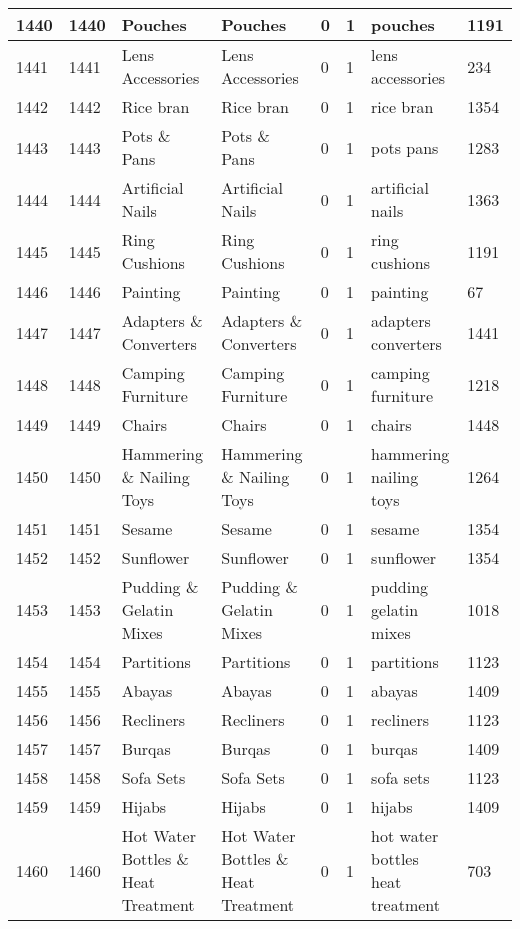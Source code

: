 \begin{longtable}{|l|l|l|l|l|l|l|l|}
1440 & 1440 & Pouches & Pouches & 0 & 1 & pouches & 1191 \\ \hline 
1441 & 1441 & Lens Accessories & Lens Accessories & 0 & 1 & lens accessories & 234 \\ \hline 
1442 & 1442 & Rice bran & Rice bran & 0 & 1 & rice bran & 1354 \\ \hline 
1443 & 1443 & Pots \& Pans & Pots \& Pans & 0 & 1 & pots pans & 1283 \\ \hline 
1444 & 1444 & Artificial Nails & Artificial Nails & 0 & 1 & artificial nails & 1363 \\ \hline 
1445 & 1445 & Ring Cushions & Ring Cushions & 0 & 1 & ring cushions & 1191 \\ \hline 
1446 & 1446 & Painting & Painting & 0 & 1 & painting & 67 \\ \hline 
1447 & 1447 & Adapters \& Converters & Adapters \& Converters & 0 & 1 & adapters converters & 1441 \\ \hline 
1448 & 1448 & Camping Furniture & Camping Furniture & 0 & 1 & camping furniture & 1218 \\ \hline 
1449 & 1449 & Chairs & Chairs & 0 & 1 & chairs & 1448 \\ \hline 
1450 & 1450 & Hammering \& Nailing Toys & Hammering \& Nailing Toys & 0 & 1 & hammering nailing toys & 1264 \\ \hline 
1451 & 1451 & Sesame & Sesame & 0 & 1 & sesame & 1354 \\ \hline 
1452 & 1452 & Sunflower & Sunflower & 0 & 1 & sunflower & 1354 \\ \hline 
1453 & 1453 & Pudding \& Gelatin Mixes & Pudding \& Gelatin Mixes & 0 & 1 & pudding gelatin mixes & 1018 \\ \hline 
1454 & 1454 & Partitions & Partitions & 0 & 1 & partitions & 1123 \\ \hline 
1455 & 1455 & Abayas & Abayas & 0 & 1 & abayas & 1409 \\ \hline 
1456 & 1456 & Recliners & Recliners & 0 & 1 & recliners & 1123 \\ \hline 
1457 & 1457 & Burqas & Burqas & 0 & 1 & burqas & 1409 \\ \hline 
1458 & 1458 & Sofa Sets & Sofa Sets & 0 & 1 & sofa sets & 1123 \\ \hline 
1459 & 1459 & Hijabs & Hijabs & 0 & 1 & hijabs & 1409 \\ \hline 
1460 & 1460 & Hot Water Bottles \& Heat Treatment & Hot Water Bottles \& Heat Treatment & 0 & 1 & hot water bottles heat treatment & 703 \\ \hline 

\end{longtable}
